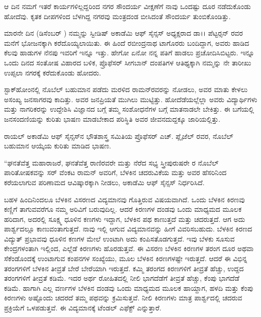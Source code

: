 ಆ ದಿನ ನಮಗೆ ಇತರೆ ಕಾರ್ಯಗಳಿಲ್ಲದ್ದರಿಂದ ನಗರ ಸೌಂದರ್ಯ ವೀಕ್ಷಣೆಗೆ ನಾವು ಒಂದಷ್ಟು ದೂರ ನಡೆದುಕೊಂಡು ಹೋದೆವು. ಕೃತಕ ದೀಪಗಳಿಂದ ಬೆಳಗಿದ್ದ ನಗರವು ಮಂತ್ರದಂಡ ಬೀಸಿದಂತೆ ಸೌಂದರ್ಯ ತುಂಬಿಕೊಂಡಿತ್ತು.

ಮಾರನೇ ದಿನ (ಡಿಸೆಂಬರ್ ) ನಮ್ಮನ್ನು ಸ್ವೀಡಿಷ್ ಅಕಾಡೆಮಿ ಆಫ್ ಸೈನ್ಸಸ್ ಅಧ್ಯಕ್ಷರಾದ ಡಾ।। ಪೆಟ್ಟರ್‍ಸನ್ ರವರ ಮನೆಗೆ ಭೋಜನಕ್ಕಾಗಿ ಕರೆದೊಯ್ಯಲಾಯಿತು. ಈ ಹಿಂದೆ ರಬೀಂದ್ರನಾಥ ಟಾಗೊರರು ಬಂದಿದ್ದಾಗ, ಅವರು ಹಾಡಿದ ಕೆಲವು ಹಾಡುಗಳ ನೆನಪು ಇವರಿಗೆ ಇನ್ನೂ ಇತ್ತು. ಹೇಗೋ ಏನೋ ನನ್ನ ಪತಿಗೆ ಹಾಡಲು ಪ್ರಚೋದಿಸಿಬಿಟ್ಟರು. ಇನ್ನೂ ಒಂದು ದಿನದ ಸಂತೋಷ ವಿಹಾರದ ಬಳಿಕ, ಪ್ರೊಫೆಸರ್ ಸೀಗಬಾನ್ ದಂಪತಿಗಳ ಆತಿಥ್ಯಕ್ಕಾಗಿ ನಮ್ಮನ್ನು ನೇ ತಾರೀಖು ಉಪ್ಸಲಾ ನಗರಕ್ಕೆ ಕರೆದುಕೊಂಡು ಹೋದರು.

ಸ್ಟಾಕ್‍ಹೋಂನಲ್ಲಿ ನೊಬೆಲ್ ಬಹುಮಾನ ಪಡೆದು ಮರಳಿದ ರಾಮನ್‍ರವರನ್ನು ನೋಡಲು, ಅವರ ಮಾತು ಕೇಳಲು ಅಸಂಖ್ಯ ಜನಸಾಗರವು ಕಾದಿತ್ತು. ಅವರ ಜನಪ್ರಿಯತೆ ಮುಗಿಲು ಮುಟ್ಟಿತ್ತು. ಹೋದೆಡೆಯಲ್ಲೆಲ್ಲಾ ಅವರು ವಿದ್ಯಾರ್ಥಿಗಳು ಮತ್ತು ನಾಗರಿಕರನ್ನು ಉದ್ದೇಶಿಸಿ ವಿಜ್ಞಾನದ ಬಗ್ಗೆ ತಮ್ಮ ಸಂಶೋಧನೆಗಳ ಬಗ್ಗೆ ಮಾತನಾಡಲೇ ಬೇಕಿತ್ತು. ಈ ಬಗೆಯಲ್ಲಿ ಜನಸಂದಣಿಯನ್ನು ಕುರಿತು ಭಾಷಣ ಮಾಡಬೇಕಾದ ಪರಿಸ್ಥಿತಿ ಅವರ ಜೀವನದುದ್ದಕ್ಕೂ ಜಾರಿಯಲ್ಲಿತ್ತು.

ರಾಯಲ್ ಅಕಾಡೆಮಿ ಆಫ್ ಸೈನ್ಸಸ್‍ನ ಭೌತಶಾಸ್ತ್ರ ಸಮಿತಿಯ ಪ್ರೊಫೆಸರ್ ಎಚ್. ಪ್ಲೈಜೆಲ್ ರವರ, ನೊಬೆಲ್ ಬಹುಮಾನ ಆಯ್ಕೆಯ ಕುರಿತು ಮಾಡಿದ ಭಾಷಣ.

“ಘನತೆವೆತ್ತ ಮಹಾರಾಜರೆ, ಘನತೆವೆತ್ತ ರಾಣಿರವರೇ ಮತ್ತು ನೆರೆದ ಸಭ್ಯ ಸ್ತ್ರೀ\enginline{-}ಪುರುಷರೇ  ರ ನೊಬೆಲ್ ಪಾರಿತೋಷಕವನ್ನು ಸರ್ ವೆಂಕಟ ರಾಮನ್ ಅವರಿಗೆ, ಬೆಳಕಿನ ಚದರುವಿಕೆಯ ಮತ್ತು ಅವರ ಹೆಸರಿನಿಂದ ಕರೆಯಲಾಗುವ ಪರಿಣಾಮದ ಆವಿಷ್ಕಾರಕ್ಕಾಗಿ ನೀಡಲು, ಅಕಾಡೆಮಿ ಆಫ್ ಸೈನ್ಸಸ್ ನಿರ್ಧರಿಸಿದೆ.

ಬಹಳ ಹಿಂದಿನಿಂದಲೂ ಬೆಳಕಿನ ವಿಸರಣದ ವಿದ್ಯಮಾನವು ಗೊತ್ತಿರುವ ವಿಷಯವಾಗಿದೆ. ಒಂದು ಬೆಳಕಿನ ಕಿರಣವು ಕಣ್ಣಿಗೆ ತಾಗುವವರೆಗೂ ನಮ್ಮ ಅರಿವಿಗೆ ಬರುವುದಿಲ್ಲ. ಆದರೆ ಕಿರಣಗಳ ದಂಡವು ಒಂದು ಮಾಧ್ಯಮದ ಮೂಲಕ ಹರಿದಾಗ, ಅದರಲ್ಲಿ ಸೂಕ್ಷ್ಮ ಧೂಳಿನ ಕಣಗಳು ಇದ್ದಾಗ, ಬೆಳಕಿನ ಪಥ ಕಾಣುತ್ತದೆ ಮತ್ತು ಚದರುತ್ತದೆ. ಆಗ ಅದು ಪಾರ್ಶ್ವದಲ್ಲೂ ಕಾಣುವಂತಾಗುತ್ತದೆ. ನಾವು ಇಲ್ಲಿ ಆಗುವ ವಿದ್ಯಮಾನವನ್ನು ಹೀಗೆ ವಿವರಿಸಬಹುದು. ಬೆಳಕಿನ ಕಿರಣದ ವಿದ್ಯುತ್ ಪ್ರಭಾವವು ಧೂಳಿನ ಕಣಗಳ ಮೇಲೆ ಉಂಟಾಗಿ ಅದು ಕಂಪಿಸತೊಡಗುತ್ತದೆ. ಇವು ಬೆಳಕು ಸೂಸುವ ಕೇಂದ್ರಗಳಂತಾಗಿ ಇಲ್ಲಿಂದ, ಎಲ್ಲೆಡೆ ಕಿರಣಗಳು ಹೊರಡುತ್ತವೆ. ಈ ವಿಸರಣ ಬೆಳಕಿನ ಕಿರಣಗಳ ತರಂಗ ದೂರ ಅಥವಾ ಸೆಕೆಂಡೊಂದಕ್ಕೆ ಉಂಟಾಗುವ ಕಂಪನಗಳ ಸಂಖ್ಯೆಯು, ಮೂಲ ಬೆಳಕಿನ ಕಿರಣಗಳಷ್ಟೇ ಇರುತ್ತದೆ. ಆದರೆ ಈ ವಿಭಿನ್ನ ತರಂಗಗಳಿಗೆ ಬೆಳಕಿನ ತೀವ್ರತೆ ಬೇರೆ ಬೇರೆಯಾಗಿ ಇರುತ್ತದೆ. ಕಮ್ಮಿ ತರಂಗದ ಕಿರಣಗಳಿಗೆ ತೀವ್ರತೆ ಹೆಚ್ಚು, ಉದ್ದದ ತರಂಗಗಳಿಗೆ ತೀವ್ರತೆ ಕಡಿಮೆ. ಇದರ ಅರ್ಥ ರೋಹಿತದಲ್ಲಿ ನೀಲಿ ಭಾಗದೆಡೆಗೆ ತೀವ್ರತೆ ಹೆಚ್ಚು, ಕೆಂಪು ಭಾಗದೆಡೆ ಕಡಿಮೆ. ಹಾಗಾಗಿ ಎಲ್ಲ ವರ್ಣಗಳ ಬೆಳಕಿನ ದಂಡವು ಒಂದು ಮಾಧ್ಯಮದ ಮೂಲಕ ಹಾಯ್ದಾಗ, ಹಳದಿ ಮತ್ತು ಕೆಂಪು ಕಿರಣಗಳು ಅಷ್ಟೊಂದು ಚದರದೆ ತಮ್ಮ ಪಥವನ್ನು ಕ್ರಮಿಸುತ್ತವೆ. ನೀಲಿ ಕಿರಣಗಳು ಮಾತ್ರ ಪಾರ್ಶ್ವದಲ್ಲಿ ಚದರುವ ಪ್ರಕ್ರಿಯೆಗೆ ಒಳಪಡುತ್ತವೆ. ಈ ವಿದ್ಯಮಾನಕ್ಕೆ ಟೆಂಡಲ್ ಎಫೆಕ್ಟ್ ಎನ್ನುತ್ತಾರೆ.

\vskip 1pt

